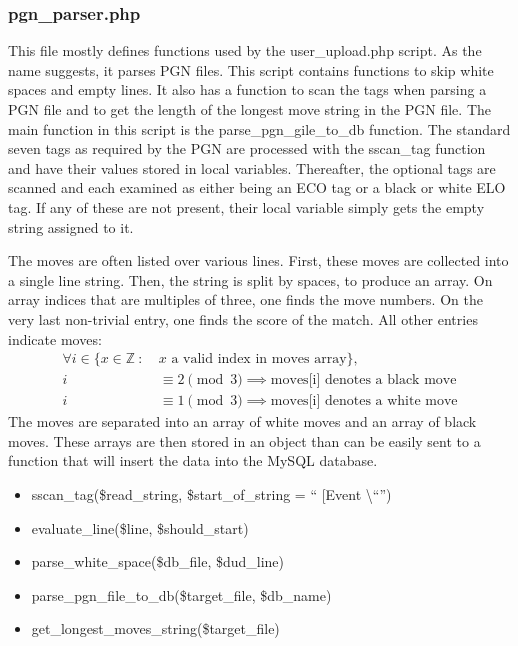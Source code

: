 \documentclass{article}
\begin{document}
\subsubsection{pgn\_parser.php}
This file mostly defines functions used by the user\_upload.php script.
As the name suggests, it parses PGN files. This script contains functions to
skip white spaces and empty lines. It also has a function to scan the tags
when parsing a PGN file and to get the length of the longest move string in
the PGN file. The main function in this script is the parse\_pgn\_gile\_to\_db
function. The standard seven tags as required by the PGN are processed with
the sscan\_tag function and have their values stored in local variables.
Thereafter, the optional tags are scanned and each examined as either being
an ECO tag or a black or white ELO tag.  If any of these are not present,
their local variable simply gets the empty string assigned to it.

The moves are often listed over various lines.  First, these moves are
collected into a single line string.  Then, the string is split by spaces,
to produce an array.  On array indices that are multiples of three, one
finds the move numbers.  On the very last non-trivial entry, one finds
the score of the match.  All other entries indicate moves:
\begin{align*}
\forall i \in \{ x\in \mathbb{Z}\ :\ & x\text{ a valid index in moves array}\},\\
i & \equiv 2\pmod 3 \implies \text{moves[i] denotes a black move}\\
i & \equiv 1\pmod 3 \implies \text{moves[i] denotes a white move}
\end{align*}
The moves are separated into an array of white moves and an array of black
moves. These arrays are then stored in an object than can be easily sent to
a function that will insert the data into the MySQL database.

\begin{itemize}
	\item sscan\_tag(\$read\_string, \$start\_of\_string = \textquotedblleft
	[Event \textbackslash \textquotedblleft\textquotedblright )
	\item evaluate\_line(\$line, \$should\_start)
	\item parse\_white\_space(\$db\_file, \$dud\_line)
	\item parse\_pgn\_file\_to\_db(\$target\_file, \$db\_name)
	\item get\_longest\_moves\_string(\$target\_file)
\end{itemize}
\end{document}
